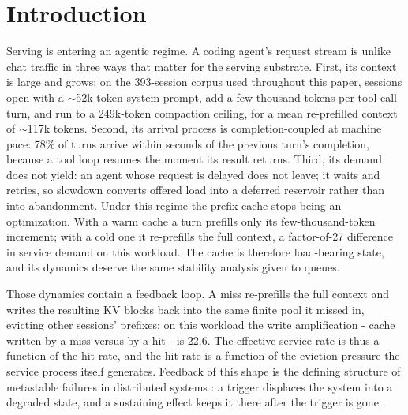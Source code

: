 \section{Introduction}
\label{sec:intro}

Serving is entering an agentic regime. A coding agent's request
stream is unlike chat traffic in three ways that matter for the
serving substrate. First, its context is large and grows: on the
393-session corpus used throughout this paper, sessions open with a
$\sim$52k-token system prompt, add a few thousand tokens per tool-call
turn, and run to a 249k-token compaction ceiling, for a mean
re-prefilled context of $\sim$117k tokens. Second, its arrival process is
completion-coupled at machine pace: 78\% of turns arrive within
seconds of the previous turn's completion, because a tool loop
resumes the moment its result returns. Third, its demand does not
yield: an agent whose request is delayed does not leave; it waits
and retries, so slowdown converts offered load into a deferred
reservoir rather than into abandonment. Under this regime the prefix
cache stops being an optimization. With a warm cache a turn prefills
only its few-thousand-token increment; with a cold one it re-prefills
the full context, a factor-of-27 difference in service demand on this
workload. The cache is therefore load-bearing state, and its dynamics
deserve the same stability analysis given to queues.

Those dynamics contain a feedback loop. A miss re-prefills the full
context and writes the resulting KV blocks back into the same finite
pool it missed in, evicting other sessions' prefixes; on this
workload the write amplification - cache written by a miss versus by
a hit - is 22.6. The effective service rate is thus a function of the
hit rate, and the hit rate is a function of the eviction pressure the
service process itself generates. Feedback of this shape is the
defining structure of metastable failures in distributed systems
\cite{bronson2021metastable,huang2022wild}: a trigger displaces the
system into a degraded state, and a sustaining effect keeps it there
after the trigger is gone.

